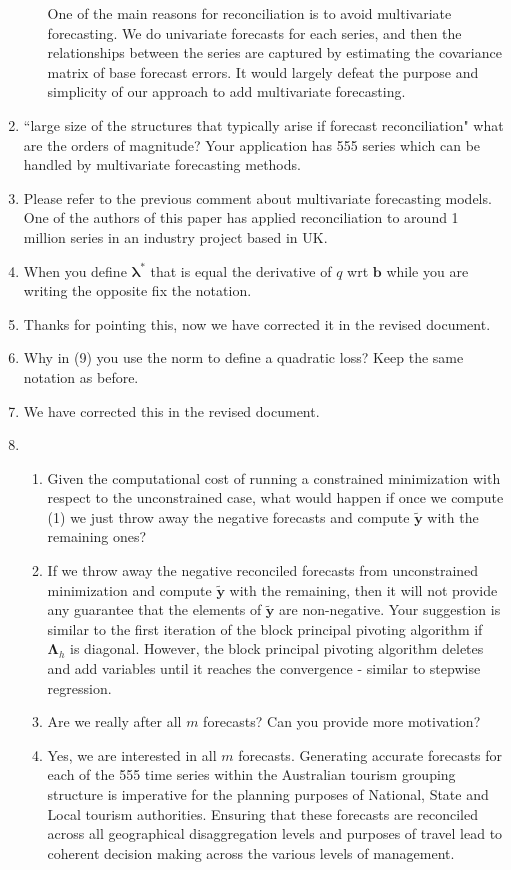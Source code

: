 \documentclass[10pt,a4paper]{article}
\begin{document}
\begin{enumerate}
\begin{enumerate}
{	One of the main reasons for reconciliation is to avoid multivariate forecasting. We do univariate forecasts for each series, and then the relationships between the series are captured by estimating the covariance matrix of base forecast errors. It would largely defeat the purpose and simplicity of our approach to add multivariate forecasting.} 
\end{enumerate} 
\item ``large size of the structures that typically arise if forecast reconciliation" what are the orders of magnitude? Your application has 555 series which can be handled by multivariate forecasting methods.
\item [] {\color{blue} Please refer to the previous comment about multivariate forecasting models. One of the authors of this paper has applied reconciliation to around 1 million series in an industry project based in UK.}
\item When you define $\bm{\lambda}^*$ that is equal the derivative of $q$ wrt $\bm{b}$ while you are writing the opposite fix the notation.
\item [] {\color{blue} Thanks for pointing this, now we have corrected it in the revised document.}
\item Why in (9) you use the norm to define a quadratic loss? Keep the same notation as before.
\item [] {\color{blue} We have corrected this in the revised document.}
\item \begin{enumerate}
	\item Given the computational cost of running a constrained minimization with respect to the unconstrained case, what would happen if once we compute (1) we just throw away the negative forecasts and compute $\tilde{\bm{y}}$ with the remaining ones?
	\item [] {\color{blue} If we throw away the negative reconciled forecasts from unconstrained minimization and compute $\tilde{\bm{y}}$ with the remaining, then it will not provide any guarantee that the elements of $\tilde{\bm{y}}$ are non-negative. Your suggestion is similar to the first iteration of the block principal pivoting algorithm if $\bm{\Lambda}_h$ is diagonal. However, the block principal pivoting algorithm deletes and add variables until it reaches the convergence - similar to stepwise regression.}
	\item Are we really after all $m$ forecasts? Can you provide more motivation?
	\item [] {\color{blue} Yes, we are interested in all $m$ forecasts. Generating accurate forecasts for each of the 555 time series within the Australian tourism grouping structure is imperative for the planning purposes of National, State and Local tourism authorities. Ensuring that these forecasts are reconciled across all geographical disaggregation levels and purposes of travel lead to coherent decision making across the various levels of management.}

\end{enumerate}
\end{enumerate}
\end{document}
